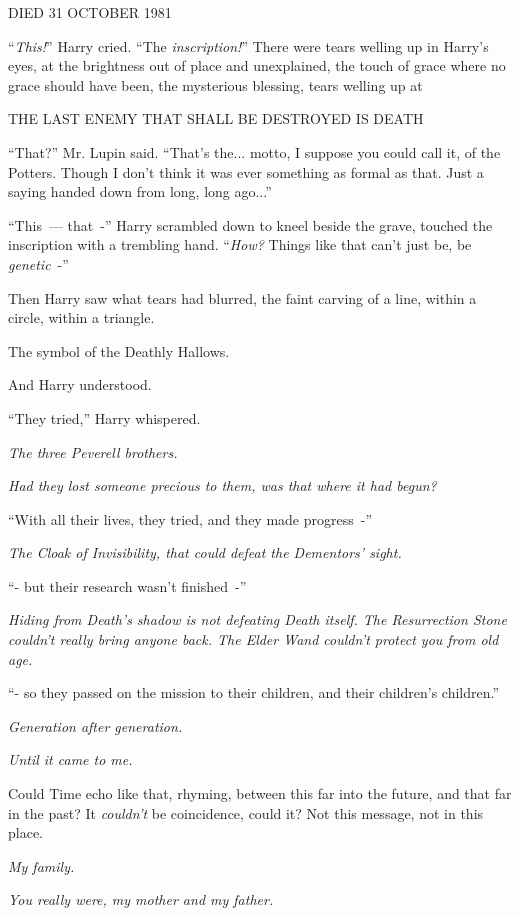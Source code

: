 DIED 31 OCTOBER 1981

``\emph{This!}'' Harry cried. ``The \emph{inscription!}'' There were tears welling up in Harry's eyes, at the brightness out of place and unexplained, the touch of grace where no grace should have been, the mysterious blessing, tears welling up at

THE LAST ENEMY THAT SHALL BE DESTROYED IS DEATH

``That?'' Mr. Lupin said. ``That's the... motto, I suppose you could call it, of the Potters. Though I don't think it was ever something as formal as that. Just a saying handed down from long, long ago...''

``This~--- that~-'' Harry scrambled down to kneel beside the grave, touched the inscription with a trembling hand. ``\emph{How?} Things like that can't just be, be \emph{genetic}~-''

Then Harry saw what tears had blurred, the faint carving of a line, within a circle, within a triangle.

The symbol of the Deathly Hallows.

And Harry understood.

``They tried,'' Harry whispered.

\emph{The three Peverell brothers.}

\emph{Had they lost someone precious to them, was that where it had begun?}

``With all their lives, they tried, and they made progress~-''

\emph{The Cloak of Invisibility, that could defeat the Dementors' sight.}

``- but their research wasn't finished~-''

\emph{Hiding from Death's shadow is not defeating Death itself. The Resurrection Stone couldn't really bring anyone back. The Elder Wand couldn't protect you from old age.}

``- so they passed on the mission to their children, and their children's children.''

\emph{Generation after generation.}

\emph{Until it came to me.}

Could Time echo like that, rhyming, between this far into the future, and that far in the past? It \emph{couldn't} be coincidence, could it? Not this message, not in this place.

\emph{My family.}

\emph{You really were, my mother and my father.}

